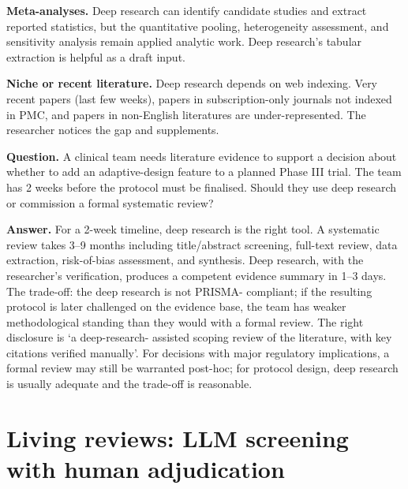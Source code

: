 \documentclass[
  letterpaper,
  11pt]{scrbook}
\begin{document}
\textbf{Meta-analyses.} Deep research can identify candidate studies and
extract reported statistics, but the quantitative pooling, heterogeneity
assessment, and sensitivity analysis remain applied analytic work. Deep
research's tabular extraction is helpful as a draft input.

\textbf{Niche or recent literature.} Deep research depends on web
indexing. Very recent papers (last few weeks), papers in
subscription-only journals not indexed in PMC, and papers in non-English
literatures are under-represented. The researcher notices the gap and
supplements.

\begin{tcolorbox}[enhanced jigsaw, arc=.35mm, bottomrule=.15mm, bottomtitle=1mm, breakable, colback=white, colbacktitle=quarto-callout-note-color!10!white, colframe=quarto-callout-note-color-frame, coltitle=black, left=2mm, leftrule=.75mm, opacityback=0, opacitybacktitle=0.6, rightrule=.15mm, title={Check your understanding: deep research vs systematic review}, titlerule=0mm, toprule=.15mm, toptitle=1mm]

\textbf{Question.} A clinical team needs literature evidence to support
a decision about whether to add an adaptive-design feature to a planned
Phase III trial. The team has 2 weeks before the protocol must be
finalised. Should they use deep research or commission a formal
systematic review?

\textbf{Answer.} For a 2-week timeline, deep research is the right tool.
A systematic review takes 3--9 months including title/abstract
screening, full-text review, data extraction, risk-of-bias assessment,
and synthesis. Deep research, with the researcher's verification,
produces a competent evidence summary in 1--3 days. The trade-off: the
deep research is not PRISMA- compliant; if the resulting protocol is
later challenged on the evidence base, the team has weaker
methodological standing than they would with a formal review. The right
disclosure is `a deep-research- assisted scoping review of the
literature, with key citations verified manually'. For decisions with
major regulatory implications, a formal review may still be warranted
post-hoc; for protocol design, deep research is usually adequate and the
trade-off is reasonable.

\end{tcolorbox}

\section{Living reviews: LLM screening with human
adjudication}\label{living-reviews-llm-screening-with-human-adjudication}
\end{document}
